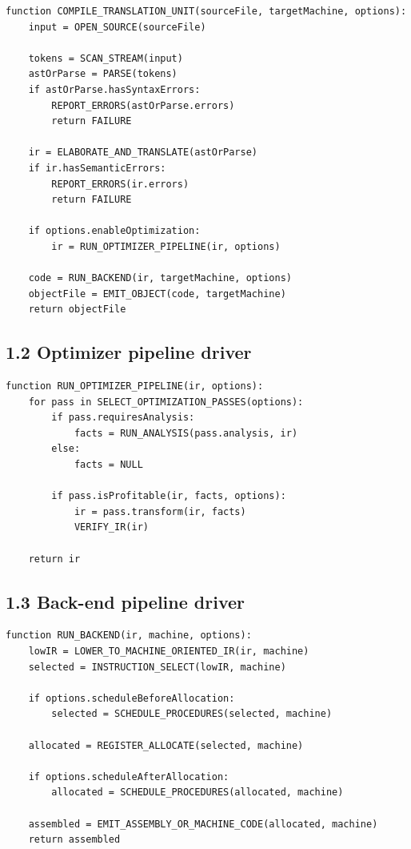 \documentclass[10pt,letterpaper]{article}
\begin{document}
\begin{verbatim}
function COMPILE_TRANSLATION_UNIT(sourceFile, targetMachine, options):
    input = OPEN_SOURCE(sourceFile)

    tokens = SCAN_STREAM(input)
    astOrParse = PARSE(tokens)
    if astOrParse.hasSyntaxErrors:
        REPORT_ERRORS(astOrParse.errors)
        return FAILURE

    ir = ELABORATE_AND_TRANSLATE(astOrParse)
    if ir.hasSemanticErrors:
        REPORT_ERRORS(ir.errors)
        return FAILURE

    if options.enableOptimization:
        ir = RUN_OPTIMIZER_PIPELINE(ir, options)

    code = RUN_BACKEND(ir, targetMachine, options)
    objectFile = EMIT_OBJECT(code, targetMachine)
    return objectFile
\end{verbatim}

\subsection*{1.2 Optimizer pipeline driver}
{}

\begin{verbatim}
function RUN_OPTIMIZER_PIPELINE(ir, options):
    for pass in SELECT_OPTIMIZATION_PASSES(options):
        if pass.requiresAnalysis:
            facts = RUN_ANALYSIS(pass.analysis, ir)
        else:
            facts = NULL

        if pass.isProfitable(ir, facts, options):
            ir = pass.transform(ir, facts)
            VERIFY_IR(ir)

    return ir
\end{verbatim}

\subsection*{1.3 Back-end pipeline driver}
{}

\begin{verbatim}
function RUN_BACKEND(ir, machine, options):
    lowIR = LOWER_TO_MACHINE_ORIENTED_IR(ir, machine)
    selected = INSTRUCTION_SELECT(lowIR, machine)

    if options.scheduleBeforeAllocation:
        selected = SCHEDULE_PROCEDURES(selected, machine)

    allocated = REGISTER_ALLOCATE(selected, machine)

    if options.scheduleAfterAllocation:
        allocated = SCHEDULE_PROCEDURES(allocated, machine)

    assembled = EMIT_ASSEMBLY_OR_MACHINE_CODE(allocated, machine)
    return assembled
\end{verbatim}
\end{document}

